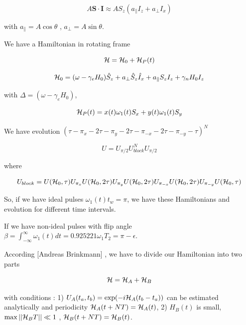 \documentclass[
  onecolumn,
  aps,
  amsmath,
  amssymb,
  superscriptaddress,
  nofootinbib,
  floatfix
]{revtex4-2}
\newcommand{\0}{^{\phantom{\dagger}}}
\begin{document}
\begin{equation}
A\boldsymbol{S}\cdot\boldsymbol{I}\approx AS_{z}(a_{\parallel}I_{z}+a_{\perp}I_{x})
\end{equation}

with $a_{\parallel}=A\cos\theta$ , $a_{\perp}=A\sin\theta$.

We have a Hamiltonian in rotating frame

\begin{equation}
{\cal H}={\cal H}_{0}+{\cal H}_{P}(t)
\end{equation}

\begin{equation}
{\cal H}_{0}=(\omega-\gamma_{e}H_{0})\hat{S}_{z}+a_{\perp}\hat{S}_{z}\hat{I}_{x}+a_{\parallel}S_{z}I_{z}+\gamma_{n}H_{0}I_{z}
\end{equation}

with $\Delta=(\omega-\gamma_{e}H_{0})$,

\begin{equation}
{\cal H}_{P}(t)=x(t)\omega_{1}(t)S_{x}+y(t)\omega_{1}(t)S_{y}
\end{equation}

We have evolution $(\tau-\pi_{x}-2\tau-\pi_{y}-2\tau-\pi_{-x}-2\tau-\pi_{-y}-\tau)^{N}$

\begin{equation}
U=U_{\pi/2}U_{block}^{N}U_{\pi/2}
\end{equation}

where

\begin{equation}
U_{block}=U({\cal H}_{0},\tau)U_{\pi_{x}}U({\cal H}_{0},2\tau)U_{\pi_{y}}U({\cal H}_{0},2\tau)U_{\pi_{-x}}U({\cal H}_{0},2\tau)U_{\pi_{-y}}U({\cal H}_{0},\tau)
\end{equation}

So, if we have ideal pulses $\omega_{1}(t)t_{w}=\pi$, we have these
Hamiltonians and evolution for different time intervals.

If we have non-ideal pulses with flip angle $\beta=\int_{-\infty}^{\infty}\omega_{1}(t)dt=0.925221\omega_{1}T_{2}=\pi-\epsilon$.

According {[}Andreas Brinkmann{]} , we have to divide our Hamiltonian
into two parts

\begin{equation}
{\cal H}={\cal H}_{A}+{\cal H}_{B}
\end{equation}

with conditions : 1) $U_{A}(t_{a},t_{b})=\exp(-i{\cal H}_{A}(t_{b}-t_{a}))$
can be estimated analytically and periodicity ${\cal H}_{A}(t+NT)={\cal H}_{A}(t)$,
2) $H_{B}(t)$ is small, $\max||{\cal H}_{B}T||\ll1$ , ${\cal H}_{B}(t+NT)={\cal H}_{B}(t)$.
\end{document}
